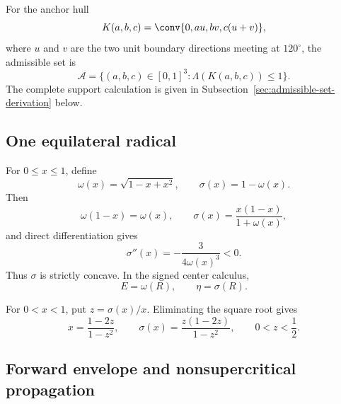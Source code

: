 For the anchor hull
\[
 K(a,b,c)=\conv\{0,au,bv,c(u+v)\},
\]
where $u$ and $v$ are the two unit boundary directions meeting at $120^\circ$,
the admissible set is
\begin{equation}
 \mathcal A
 =\{(a,b,c)\in[0,1]^3:\Lambda(K(a,b,c))\le1\}.
 \label{eq:universal-admissible-gauge}
\end{equation}
The complete support calculation is given in
Subsection~\ref{sec:admissible-set-derivation} below.

\subsection{One equilateral radical}

For $0\le x\le1$, define
\begin{equation}
 \omega(x)=\sqrt{1-x+x^2},
 \qquad
 \sigma(x)=1-\omega(x).
 \label{eq:universal-radical}
\end{equation}
Then
\begin{equation}
 \omega(1-x)=\omega(x),
 \qquad
 \sigma(x)=\frac{x(1-x)}{1+\omega(x)},
 \label{eq:universal-radical-identities}
\end{equation}
and direct differentiation gives
\begin{equation}
 \sigma''(x)=-\frac3{4\omega(x)^3}<0.
 \label{eq:universal-sigma-concavity}
\end{equation}
Thus $\sigma$ is strictly concave.  In the signed center calculus,
\[
 E=\omega(R),\qquad \eta=\sigma(R).
\]

For $0<x<1$, put $z=\sigma(x)/x$.  Eliminating the square root gives
\begin{equation}
 x=\frac{1-2z}{1-z^2},
 \qquad
 \sigma(x)=\frac{z(1-2z)}{1-z^2},
 \qquad 0<z<\frac12.
 \label{eq:universal-rational-radical}
\end{equation}

\subsection{Forward envelope and nonsupercritical propagation}

